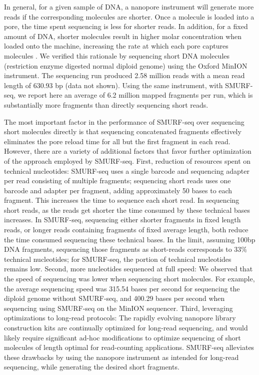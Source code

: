 In general, for a given sample of DNA, a nanopore instrument will
generate more reads if the corresponding molecules are shorter.  Once a
molecule is loaded into a pore, the time spent sequencing is less for
shorter reads. In addition, for a fixed amount of DNA, shorter molecules
result in higher molar concentration when loaded onto the machine,
increasing the rate at which each pore captures molecules
\cite{muthukumar2010theory,wanunu2008dna}. We verified this rationale by
sequencing short DNA molecules (restriction enzyme digested normal
diploid genome) using the Oxford MinION instrument. The sequencing run
produced 2.58 million reads with a mean read length of 630.93 bp (data
not shown).
Using the same instrument, with SMURF-seq, we report here an average
of 6.2 million mapped fragments per run, which is substantially more
fragments than directly sequencing short reads.


The most important factor in the performance of SMURF-seq over
sequencing short molecules directly is that sequencing concatenated
fragments effectively eliminates the pore reload time for all but the
first fragment in each read. However, there are a variety of additional
factors that favor further optimization of the approach employed by
SMURF-seq.
First, reduction of resources spent on technical nucleotides: SMURF-seq
uses a single barcode and sequencing adapter per read consisting of
multiple fragments; sequencing short reads uses one barcode and adapter
per fragment, adding approximately 50 bases to each fragment. This
increases the time to sequence each short read. In sequencing short
reads, as the reads get shorter the time consumed by these technical
bases increases. In SMURF-seq, sequencing either shorter fragments in
fixed length reads, or longer reads containing fragments of fixed
average length, both reduce the time consumed sequencing these technical
bases.
In the limit, assuming 100bp DNA fragments, sequencing those fragments
as short-reads corresponds to 33\% technical nucleotides; for SMURF-seq,
the portion of technical nucleotides remains low.
Second, more nucleotides sequenced at full speed: We observed that the
speed of sequencing was lower when sequencing short molecules. For
example, the average sequencing speed was 315.54 bases per second for
sequencing the diploid genome without SMURF-seq, and 400.29 bases per
second when sequencing using SMURF-seq on the MinION sequencer.
Third, leveraging optimizations to long-read protocols: The rapidly
evolving nanopore library construction kits are continually optimized
for long-read sequencing, and would likely require significant ad-hoc
modifications to optimize sequencing of short molecules of length
optimal for read-counting applications. SMURF-seq alleviates these
drawbacks by using the nanopore instrument as intended for long-read
sequencing, while generating the desired short fragments.



